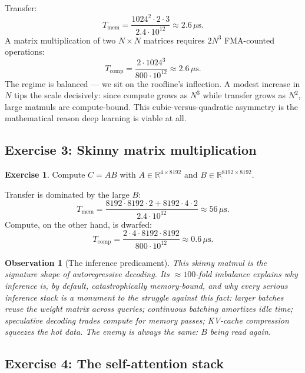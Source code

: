 \documentclass[11pt,a4paper]{article}
\theoremstyle{definition}
\newtheorem{exercise}[definition]{Exercise}
\theoremstyle{remark}
\theoremstyle{plain}
\newtheorem{observation}[definition]{Observation}
\newcommand{\us}{\,\mu\text{s}}
\begin{document}
Transfer:
\begin{equation}
T_{\text{mem}} = \frac{1024^2 \cdot 2 \cdot 3}{2.4 \cdot 10^{12}} \approx 2.6\us.
\end{equation}
A matrix multiplication of two $N \times N$ matrices requires $2N^3$ FMA-counted operations:
\begin{equation}
T_{\text{comp}} = \frac{2 \cdot 1024^3}{800 \cdot 10^{12}} \approx 2.6\us.
\end{equation}
The regime is balanced --- we sit on the roofline's inflection. A modest increase in $N$ tips the scale decisively: since compute grows as $N^3$ while transfer grows as $N^2$, large matmuls are compute-bound. This cubic-versus-quadratic asymmetry is the mathematical reason deep learning is viable at all.

\subsection{Exercise 3: Skinny matrix multiplication}

\begin{exercise}
Compute $C = A B$ with $A \in \mathbb{R}^{4 \times 8192}$ and $B \in \mathbb{R}^{8192 \times 8192}$.
\end{exercise}

Transfer is dominated by the large $B$:
\begin{equation}
T_{\text{mem}} = \frac{8192 \cdot 8192 \cdot 2 + 8192 \cdot 4 \cdot 2}{2.4 \cdot 10^{12}} \approx 56\us.
\end{equation}
Compute, on the other hand, is dwarfed:
\begin{equation}
T_{\text{comp}} = \frac{2 \cdot 4 \cdot 8192 \cdot 8192}{800 \cdot 10^{12}} \approx 0.6\us.
\end{equation}

\begin{observation}[The inference predicament]
This skinny matmul is the signature shape of autoregressive decoding. Its $\approx 100$-fold imbalance explains why inference is, by default, catastrophically memory-bound, and why every serious inference stack is a monument to the struggle against this fact: larger batches reuse the weight matrix across queries; continuous batching amortizes idle time; speculative decoding trades compute for memory passes; KV-cache compression squeezes the hot data. The enemy is always the same: $B$ being read again.
\end{observation}

\subsection{Exercise 4: The self-attention stack}
\end{document}

